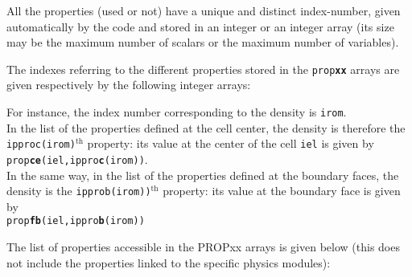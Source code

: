 {{{\begin{list}{-}{}
\item All the properties (used or not) have a unique and distinct index-number,
given automatically by the code and stored in an integer or an integer array
(its size may be the maximum number of scalars
or the maximum number of variables).

\item The indexes referring  to the different properties stored in the
\texttt{prop{\bf xx}} arrays are given respectively by the following integer arrays:




\end{list}

For instance, the index number corresponding to the density is \texttt{irom}.\\
In the list of the properties defined at the cell center, the density
is therefore the \texttt{ipproc(irom)}$^{\text{th}}$
property: its value at the center of the cell \texttt{iel} is given by \\
\texttt{prop{\bf ce}(iel,ippro{\bf c}(irom))}.\\
In the same way, in the list of the properties defined at the boundary
faces, the density is the
\texttt{ipprob(irom))}$^{\text{th}}$ property: its value at the boundary
face is given by \\
\texttt{prop{\bf fb}(iel,ippro{\bf b}(irom))}

The list of properties accessible in the PROPxx arrays is given below (this does
not include the properties linked to the specific physics modules):



}}}
